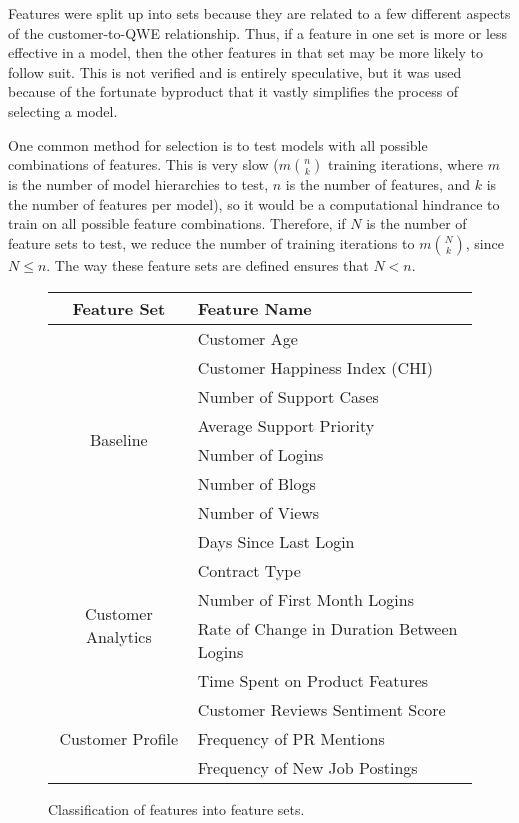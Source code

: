 \documentclass{article}
\begin{document}
	Features were split up into sets because they are related to a few different aspects of the customer-to-QWE relationship. Thus, if a feature in one set is more or less effective in a model, then the other features in that set may be more likely to follow suit. This is not verified and is entirely speculative, but it was used because of the fortunate byproduct that it vastly simplifies the process of selecting a model. 
	
	One common method for selection is to test models with all possible combinations of features. This is very slow ($m {n \choose k}$ training iterations, where $m$ is the number of model hierarchies to test, $n$ is the number of features, and $k$ is the number of features per model), so it would be a computational hindrance to train on all possible feature combinations. Therefore, if $N$ is the number of feature sets to test, we reduce the number of training iterations to $m {N \choose k}$, since $N\leq n$. The way these feature sets are defined ensures that $N<n$.
	
	\begin{figure}[H]
		\centering
		\begin{tabular}{|c|l|}
			\hline
			Feature Set & Feature Name \\
			\hline
			\hline
			\multirow{8}{*}{Baseline} & Customer Age \\
			& Customer Happiness Index (CHI) \\
			& Number of Support Cases \\
			& Average Support Priority \\
			& Number of Logins \\
			& Number of Blogs \\
			& Number of Views \\
			& Days Since Last Login \\
			\hline
			\multirow{4}{*}{Customer Analytics} & Contract Type \\
			& Number of First Month Logins \\
			& Rate of Change in Duration Between Logins \\
			& Time Spent on Product Features \\
			\hline
			\multirow{3}{*}{Customer Profile} & Customer Reviews Sentiment Score \\
			& Frequency of PR Mentions \\
			& Frequency of New Job Postings \\
			\hline
		\end{tabular}
		\caption{Classification of features into feature sets.}
		\label{FeatureSetNameMap}
	\end{figure}
\end{document}
